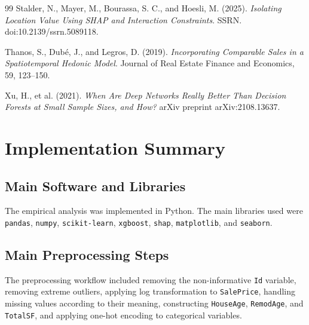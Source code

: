 \documentclass[12pt,a4paper,oneside,openany]{book}
\begin{document}
\begin{thebibliography}{99}
Stalder, N., Mayer, M., Bourassa, S. C., and Hoesli, M. (2025).
\textit{Isolating Location Value Using SHAP and Interaction Constraints}.
SSRN. doi:10.2139/ssrn.5089118.

Thanos, S., Dubé, J., and Legros, D. (2019).
\textit{Incorporating Comparable Sales in a Spatiotemporal Hedonic Model}.
Journal of Real Estate Finance and Economics, 59, 123–150.

Xu, H., et al. (2021).
\textit{When Are Deep Networks Really Better Than Decision Forests at Small Sample Sizes, and How?}
arXiv preprint arXiv:2108.13637.

\end{thebibliography}




\clearpage


\listoftables

\clearpage


\listoffigures


\appendix
\chapter{Implementation Summary}

\section{Main Software and Libraries}

The empirical analysis was implemented in Python. The main libraries used were \texttt{pandas}, \texttt{numpy}, \texttt{scikit-learn}, \texttt{xgboost}, \texttt{shap}, \texttt{matplotlib}, and \texttt{seaborn}.

\section{Main Preprocessing Steps}

The preprocessing workflow included removing the non-informative \texttt{Id} variable, removing extreme outliers, applying log transformation to \texttt{SalePrice}, handling missing values according to their meaning, constructing \texttt{HouseAge}, \texttt{RemodAge}, and \texttt{TotalSF}, and applying one-hot encoding to categorical variables.
\end{document}
